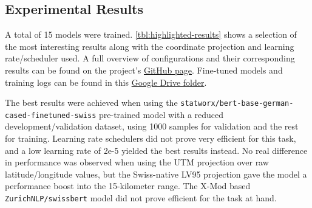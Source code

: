 \subsection{Experimental Results}
\label{sec:experimentalResults}

A total of 15 models were trained. \autoref{tbl:highlighted-results} shows a selection of the most interesting results along with the coordinate projection and learning rate/scheduler used. A full overview of configurations and their corresponding results can be found on the project's \href{https://github.com/oskarhlm/TDT13}{GitHub page}. Fine-tuned models and training logs can be found in this \href{https://drive.google.com/drive/folders/1-6nAdhvf5DBHtWzpZa6iH7z0dFETi80h?usp=sharing}{Google Drive folder}.

The best results were achieved when using the \texttt{statworx/bert-base-german-cased-finetuned-swiss} pre-trained model with a reduced development/validation dataset, using 1000 samples for validation and the rest for training. Learning rate schedulers did not prove very efficient for this task, and a low learning rate of 2e-5 yielded the best results instead. No real difference in performance was observed when using the UTM projection over raw latitude/longitude values, but the Swiss-native LV95 projection gave the model a performance boost into the 15-kilometer range. The X-Mod based \texttt{ZurichNLP/swissbert} model did not prove efficient for the task at hand.

